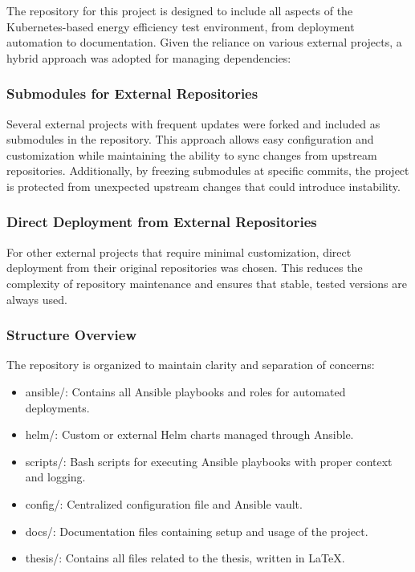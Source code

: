 The repository for this project is designed to include all aspects of the Kubernetes-based energy efficiency test environment, from deployment automation to documentation. Given the reliance on various external projects, a hybrid approach was adopted for managing dependencies:

\subsubsection{Submodules for External Repositories}
Several external projects with frequent updates were forked and included as submodules in the repository. This approach allows easy configuration and customization while maintaining the ability to sync changes from upstream repositories. Additionally, by freezing submodules at specific commits, the project is protected from unexpected upstream changes that could introduce instability.

\subsubsection{Direct Deployment from External Repositories}
For other external projects that require minimal customization, direct deployment from their original repositories was chosen. This reduces the complexity of repository maintenance and ensures that stable, tested versions are always used.

\subsubsection{Structure Overview}
The repository is organized to maintain clarity and separation of concerns:
\begin{itemize}
    \item ansible/: Contains all Ansible playbooks and roles for automated deployments.
    \item helm/: Custom or external Helm charts managed through Ansible.
    \item scripts/: Bash scripts for executing Ansible playbooks with proper context and logging.
    \item config/: Centralized configuration file and Ansible vault.
    \item docs/: Documentation files containing setup and usage of the project.
    \item thesis/: Contains all files related to the thesis, written in LaTeX.
\end{itemize}

